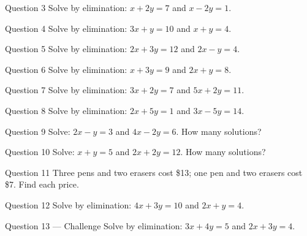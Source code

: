 \documentclass[11pt]{article}
\begin{document}
\begin{qbox}{Question 3}
Solve by elimination: $x+2y=7$ and $x-2y=1$.\workspace{2.4cm}
\end{qbox}

\begin{qbox}{Question 4}
Solve by elimination: $3x+y=10$ and $x+y=4$.\workspace{2.4cm}
\end{qbox}

\begin{qbox}{Question 5}
Solve by elimination: $2x+3y=12$ and $2x-y=4$.\workspace{2.6cm}
\end{qbox}

\begin{qbox}{Question 6}
Solve by elimination: $x+3y=9$ and $2x+y=8$.\workspace{2.6cm}
\end{qbox}

\begin{qbox}{Question 7}
Solve by elimination: $3x+2y=7$ and $5x+2y=11$.\workspace{2.4cm}
\end{qbox}

\begin{qbox}{Question 8}
Solve by elimination: $2x+5y=1$ and $3x-5y=14$.\workspace{2.4cm}
\end{qbox}

\begin{qbox}{Question 9}
Solve: $2x-y=3$ and $4x-2y=6$. How many solutions?\workspace{2.4cm}
\end{qbox}

\begin{qbox}{Question 10}
Solve: $x+y=5$ and $2x+2y=12$. How many solutions?\workspace{2.4cm}
\end{qbox}

\begin{qbox}{Question 11}
Three pens and two erasers cost \$13; one pen and two erasers cost \$7. Find each price.\workspace{2.8cm}
\end{qbox}

\begin{qbox}{Question 12}
Solve by elimination: $4x+3y=10$ and $2x+y=4$.\workspace{2.6cm}
\end{qbox}

\begin{qbox}{Question 13 --- Challenge}
Solve by elimination: $3x+4y=5$ and $2x+3y=4$.\workspace{3.0cm}
\end{qbox}

\clearpage
{}
\end{document}
